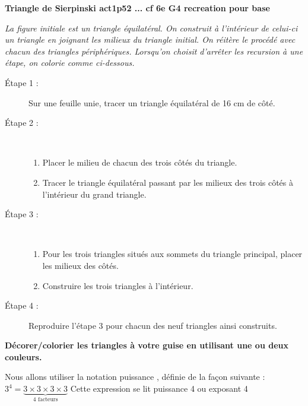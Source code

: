 \begin{changemargin}{-10mm}{-10mm}
\begin{activite}
{\bfseries
Triangle de Sierpinski act1p52 ...
cf 6e G4 recreation pour base
}

{\it
    La figure initiale est un triangle équilatéral.
    On construit à l'intérieur de celui-ci un triangle en joignant les milieux du triangle initial.
    On réitère le procédé avec chacun des triangles périphériques.
    Lorsqu'on choisit d'arrêter les recursion à une étape, on colorie comme ci-dessous.
}
    \begin{description}
       \item[Étape 1 : ] Sur une feuille unie, tracer un triangle équilatéral de 16 cm de côté.
       \item[Étape 2 : ] \ \\ [-7mm]
       \begin{enumerate}
          \item Placer le milieu de chacun des trois côtés du triangle.
          \item Tracer le triangle équilatéral passant par les milieux des trois côtés à l'intérieur du grand triangle.
        \end{enumerate}
      \item[Étape 3 : ] \ \\ [-7mm]
      \begin{enumerate}
         \item Pour les trois triangles situés aux sommets du triangle principal, placer les milieux des côtés.
         \item Construire les trois triangles à l'intérieur.
      \end{enumerate}
      \item[Étape 4 : ] Reproduire l'étape 3 pour chacun des neuf triangles ainsi construits.      
    \end{description}
    {\bfseries Décorer/colorier les triangles à votre guise en utilisant une ou deux couleurs.}
  

    \partie[dénombrement]
    Nous allons utiliser la notation \og puissance \fg{}, définie de la façon suivante : $3^4 = \underbrace{3\times 3\times 3\times 3}_\textrm{4 facteurs}$
    Cette expression se lit  puissance 4 \fg{} ou  exposant 4 \fg{}


\end{activite}
\end{changemargin}

